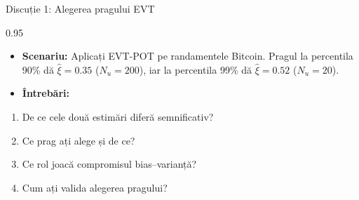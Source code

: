 \documentclass[9pt, aspectratio=169, t]{beamer}
\begin{document}
\begin{frame}{Discuție 1: Alegerea pragului EVT}
    \begin{cminipage}{0.95\textwidth}
    \begin{itemize}\setlength{\itemsep}{0pt}
        \item \textbf{Scenariu:} Aplicați EVT-POT pe randamentele Bitcoin. Pragul la percentila 90\% dă $\hat{\xi} = 0.35$ ($N_u = 200$), iar la percentila 99\% dă $\hat{\xi} = 0.52$ ($N_u = 20$).
    \end{itemize}

    \vspace{0.3cm}
    \begin{itemize}\setlength{\itemsep}{0pt}
        \item \textbf{Întrebări:}
    \end{itemize}
    \begin{enumerate}\setlength{\itemsep}{0pt}
        \item De ce cele două estimări diferă semnificativ?
        \item Ce prag ați alege și de ce?
        \item Ce rol joacă compromisul bias--varianță?
        \item Cum ați valida alegerea pragului?
    \end{enumerate}
    \end{cminipage}
\end{frame}
\end{document}
